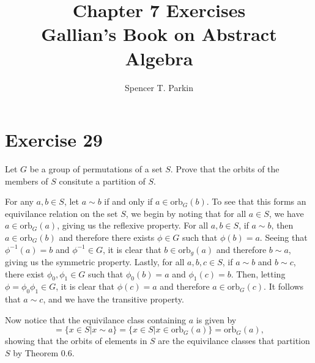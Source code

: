 \documentclass[12pt]{article}
\title{Chapter 7 Exercises\\Gallian's Book on Abstract Algebra}
\author{Spencer T. Parkin}
\newcommand{\orb}{\mbox{orb}}
\begin{document}
\maketitle

\section*{Exercise 29}

Let $G$ be a group of permutations of a set $S$.  Prove that the orbits of the
members of $S$ consitute a partition of $S$.

For any $a,b\in S$, let $a\sim b$ if and only if $a\in\orb_G(b)$.
To see that this forms an equivilance relation on the set $S$,
we begin by noting that for all $a\in S$, we have $a\in\orb_G(a)$,
giving us the reflexive property.  For all $a,b\in S$, if $a\sim b$,
then $a\in\orb_G(b)$ and therefore there exists $\phi\in G$ such
that $\phi(b)=a$.  Seeing that $\phi^{-1}(a)=b$ and $\phi^{-1}\in G$, it is clear
that $b\in\orb_g(a)$ and therefore $b\sim a$, giving us the symmetric property.
Lastly, for all $a,b,c\in S$, if $a\sim b$ and $b\sim c$, there exist $\phi_0,\phi_1\in G$
such that $\phi_0(b)=a$ and $\phi_1(c)=b$.  Then, letting $\phi=\phi_0\phi_1\in G$,
it is clear that $\phi(c)=a$ and therefore $a\in\orb_G(c)$.  It follows that $a\sim c$,
and we have the transitive property.

Now notice that the equivilance class containing $a$ is given by
\begin{equation*}
[a]=\{x\in S|x\sim a\}=\{x\in S|x\in\orb_G(a)\}=\orb_G(a),
\end{equation*}
showing that the orbits of elements in $S$ are the equivilance classes
that partition $S$ by Theorem 0.6.
\end{document}
